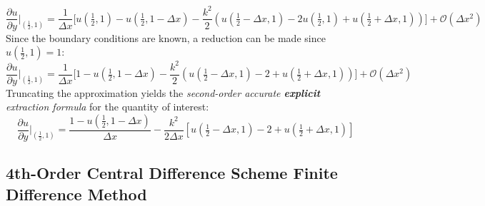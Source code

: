 \documentclass[10pt]{article}		%
\numberwithin{equation}{section}
\newcommand{\pder}[2]{\frac{\partial#1}{\partial#2}}			%
\begin{document}
\begin{equation}
\pder{u}{y}\Big|_{\left(\tfrac{1}{2}, 1\right)} = \frac{1}{\Delta x} \Big[u(\tfrac{1}{2}, 1) - u(\tfrac{1}{2}, 1-\Delta x) - \frac{k^2}{2}\left(u(\tfrac{1}{2}-\Delta x, 1) - 2u(\tfrac{1}{2}, 1) + u(\tfrac{1}{2}+\Delta x, 1)\right)\Big] + \mathcal{O}(\Delta x^2)
\end{equation}
Since the boundary conditions are known, a reduction can be made since $u(\tfrac{1}{2}, 1) = 1$:
\begin{equation}
\pder{u}{y}\Big|_{\left(\tfrac{1}{2}, 1\right)} = \frac{1}{\Delta x} \Big[1 - u(\tfrac{1}{2}, 1-\Delta x) - \frac{k^2}{2}\left(u(\tfrac{1}{2}-\Delta x, 1) - 2 + u(\tfrac{1}{2}+\Delta x, 1)\right)\Big] + \mathcal{O}(\Delta x^2)
\end{equation}
Truncating the approximation yields the \textit{second-order accurate \textbf{explicit} extraction formula} for the quantity of interest:
\begin{equation}
\pder{u}{y}\Big|_{\left(\tfrac{1}{2}, 1\right)} = \frac{1-u(\tfrac{1}{2}, 1-\Delta x)}{\Delta x} - \frac{k^2}{2\Delta x}\left[u(\tfrac{1}{2}-\Delta x, 1) - 2 + u(\tfrac{1}{2}+\Delta x, 1)\right]
\end{equation}

\newpage

\subsection{4th-Order Central Difference Scheme Finite Difference Method}
\end{document}
